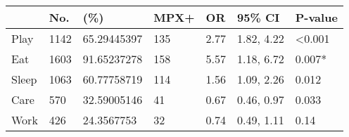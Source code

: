 \begin{tabular}{lllllll}

\toprule
 & No. &  (\%) & MPX+ & OR & 95\% CI & P-value \\
\midrule
Play & 1142 & 65.29445397 & 135 & 2.77 & 1.82, 4.22 & <0.001 \\
Eat & 1603 & 91.65237278 & 158 & 5.57 & 1.18, 6.72 & 0.007* \\
Sleep & 1063 & 60.77758719 & 114 & 1.56 & 1.09, 2.26 & 0.012 \\
Care & 570 & 32.59005146 & 41 & 0.67 & 0.46, 0.97 & 0.033 \\
Work & 426 & 24.3567753 & 32 & 0.74 & 0.49, 1.11 & 0.14 \\

\bottomrule
\end{tabular}